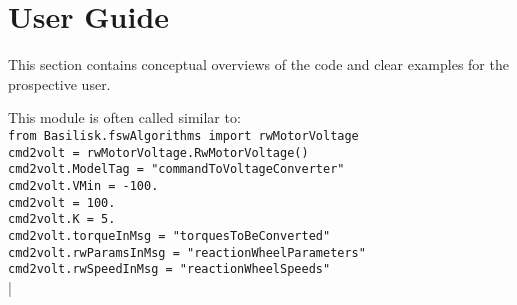 \section{User Guide}
This section contains conceptual overviews of the code and clear examples for the prospective user.

This module is often called similar to:\\
\verb|from Basilisk.fswAlgorithms import rwMotorVoltage|\\
\verb|cmd2volt = rwMotorVoltage.RwMotorVoltage()|\\
\verb|cmd2volt.ModelTag = "commandToVoltageConverter"|\\
\verb|cmd2volt.VMin = -100.|\\
\verb|cmd2volt = 100.|\\
\verb|cmd2volt.K = 5.|\\
\verb|cmd2volt.torqueInMsg = "torquesToBeConverted"|\\
\verb|cmd2volt.rwParamsInMsg = "reactionWheelParameters"|\\
\verb|cmd2volt.rwSpeedInMsg = "reactionWheelSpeeds"|\\


|

